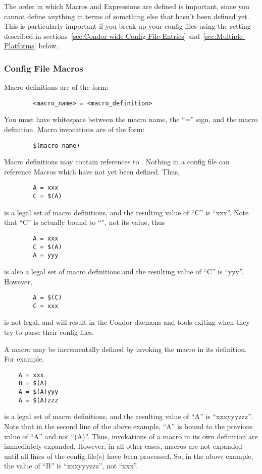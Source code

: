 The order in which Macros and Expressions are defined is important,
since you cannot define anything in terms of something else that
hasn't been defined yet.  This is particularly important if you break
up your config files using the  setting
described in sections~\ref{sec:Condor-wide-Config-File-Entries}
and~\ref{sec:Multiple-Platforms} below.

\subsubsection{\label{sec:Config-File-Macros}
Config File Macros}

Macro definitions are of the form:
\begin{verbatim}
        <macro_name> = <macro_definition>
\end{verbatim}

\Note You must have whitespace between the macro name, the
``='' sign, and the macro definition.  Macro invocations are of the
form: 
\begin{verbatim}
        $(macro_name)
\end{verbatim}
Macro definitions may contain references to .  Nothing in a config file can reference Macros which have
  not yet been defined.  Thus,
\begin{verbatim}
        A = xxx
        C = $(A) 
\end{verbatim}
is a legal set of macro definitions, and the resulting value of ``C'' is
``xxx''.  Note that ``C'' is actually bound to ``'', not its value, thus
\begin{verbatim}
        A = xxx
        C = $(A)
        A = yyy
\end{verbatim}
is also a legal set of macro definitions and the resulting value of
``C'' is ``yyy''.  However, 
\begin{verbatim}
        A = $(C)
        C = xxx
\end{verbatim}
is not legal, and will result in the Condor daemons and tools exiting
when they try to parse their config files.

A macro may be incrementally defined by invoking the macro in its
definition.  For example,
\begin{verbatim}
	A = xxx
	B = $(A)
	A = $(A)yyy
	A = $(A)zzz
\end{verbatim}
is a legal set of macro definitions, and the resulting value of ``A''
is ``xxxyyyzzz''.  Note that in the second line of the above example,
``A'' is bound to the previous value of ``A'' and not ``\MacroU(A)''.
Thus, invokations of a macro in its own definition are immediately
expanded.  However, in all other cases, macros are not expanded until
all lines of the config file(s) have been processed.  So, in the above
example, the value of ``B'' is ``xxxyyyzzz'', not ``xxx''.

